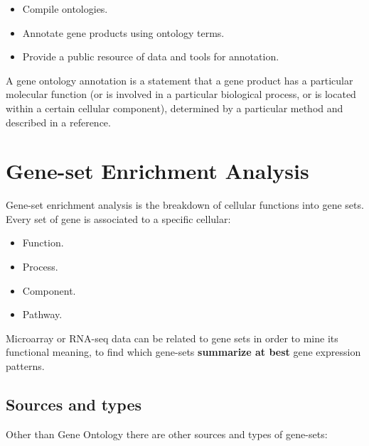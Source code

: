 	\begin{multicols}{3}
		\begin{itemize}
			\item Compile ontologies.
			\item Annotate gene products using ontology terms.
			\item Provide a public resource of data and tools for annotation.
		\end{itemize}
	\end{multicols}

	A gene ontology annotation is a statement that a gene product has a particular molecular function (or is involved in a particular biological process, or is located within a certain cellular component), determined by a particular method and described in a reference.
	
	
	
	
	

\section{Gene-set Enrichment Analysis}\label{sec:genesets}
	Gene-set enrichment analysis is the breakdown of cellular functions into gene sets.
	Every set of gene is associated to a specific cellular:

	\begin{multicols}{4}
		\begin{itemize}
			\item Function.
			\item Process.
			\item Component.
			\item Pathway.
		\end{itemize}
	\end{multicols}

	Microarray or RNA-seq data can be related to gene sets in order to mine its functional meaning, to find which gene-sets \textbf{summarize at best} gene expression patterns.

	\subsection{Sources and types}
	Other than Gene Ontology there are other sources and types of gene-sets:

